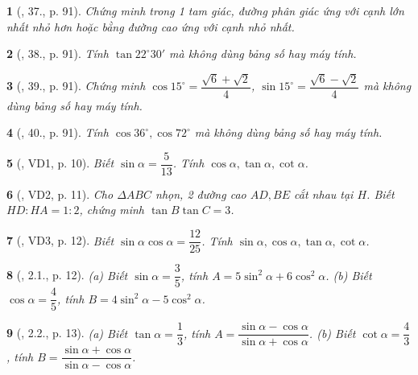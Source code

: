 \documentclass{article}
\newtheorem{baitoan}{}
\begin{document}
\begin{baitoan}[\cite{Binh_Toan_9_tap_1}, 37., p. 91]
	Chứng minh trong 1 tam giác, đường phân giác ứng với cạnh lớn nhất nhỏ hơn hoặc bằng đường cao ứng với cạnh nhỏ nhất.
\end{baitoan}

\begin{baitoan}[\cite{Binh_Toan_9_tap_1}, 38., p. 91]
	Tính $\tan22^\circ30'$ mà không dùng bảng số hay máy tính.
\end{baitoan}

\begin{baitoan}[\cite{Binh_Toan_9_tap_1}, 39., p. 91]
	Chứng minh $\cos15^\circ = \dfrac{\sqrt{6} + \sqrt{2}}{4}$, $\sin15^\circ = \dfrac{\sqrt{6} - \sqrt{2}}{4}$ mà không dùng bảng số hay máy tính.
\end{baitoan}

\begin{baitoan}[\cite{Binh_Toan_9_tap_1}, 40., p. 91]
	Tính $\cos36^\circ,\cos72^\circ$ mà không dùng bảng số hay máy tính.
\end{baitoan}

\begin{baitoan}[\cite{TLCT_THCS_Toan_9_hinh_hoc}, VD1, p. 10]
	Biết $\sin\alpha = \dfrac{5}{13}$. Tính $\cos\alpha,\tan\alpha,\cot\alpha$.
\end{baitoan}

\begin{baitoan}[\cite{TLCT_THCS_Toan_9_hinh_hoc}, VD2, p. 11]
	Cho $\Delta ABC$ nhọn, 2 đường cao $AD,BE$ cắt nhau tại $H$. Biết $HD:HA = 1:2$, chứng minh $\tan B\tan C = 3$.
\end{baitoan}

\begin{baitoan}[\cite{TLCT_THCS_Toan_9_hinh_hoc}, VD3, p. 12]
	Biết $\sin\alpha\cos\alpha = \dfrac{12}{25}$. Tính $\sin\alpha,\cos\alpha,\tan\alpha,\cot\alpha$.
\end{baitoan}

\begin{baitoan}[\cite{TLCT_THCS_Toan_9_hinh_hoc}, 2.1., p. 12]
	(a) Biết $\sin\alpha = \dfrac{3}{5}$, tính $A = 5\sin^2\alpha + 6\cos^2\alpha$. (b) Biết $\cos\alpha = \dfrac{4}{5}$, tính $B = 4\sin^2\alpha - 5\cos^2\alpha$.
\end{baitoan}

\begin{baitoan}[\cite{TLCT_THCS_Toan_9_hinh_hoc}, 2.2., p. 13]
	(a) Biết $\tan\alpha = \dfrac{1}{3}$, tính $A = \dfrac{\sin\alpha - \cos\alpha}{\sin\alpha + \cos\alpha}$. (b) Biết $\cot\alpha = \dfrac{4}{3}$, tính $B = \dfrac{\sin\alpha + \cos\alpha}{\sin\alpha - \cos\alpha}$.
\end{baitoan}
\end{document}
